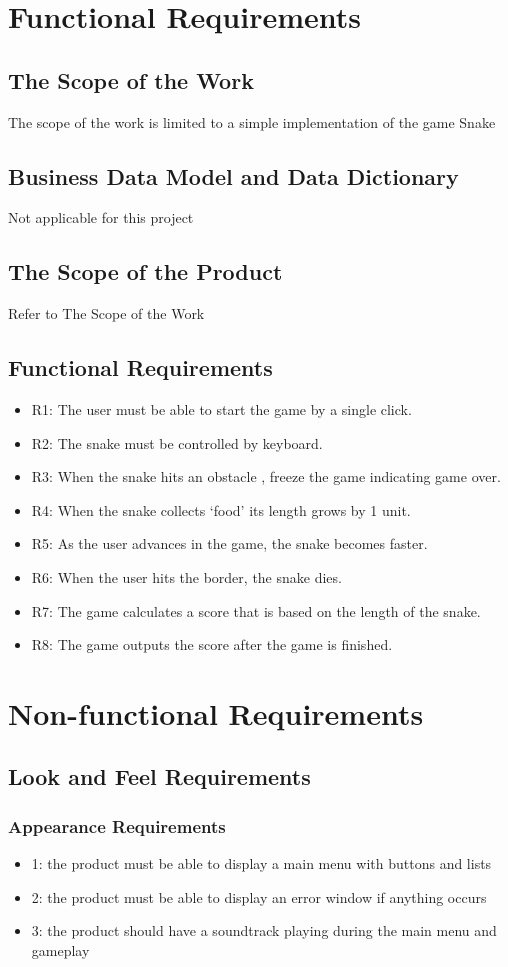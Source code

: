 \documentclass[12pt]{article}
\begin{document}
\section{Functional Requirements}
\subsection{The Scope of the Work}
The scope of the work is limited to a simple implementation of the game Snake
\subsection{Business Data Model and Data Dictionary}
Not applicable for this project
\subsection{The Scope of the Product}
Refer to The Scope of the Work
\subsection{Functional Requirements}
\begin{itemize}
\item R1: The user must be able to start the game by a single click.
\item R2: The snake must be controlled by keyboard.
\item R3: When the snake hits an obstacle , freeze the game indicating game over.
\item R4: When the snake collects ‘food’ its length grows by 1 unit.
\item R5: As the user advances in the game, the snake becomes faster.
\item R6: When the user hits the border, the snake dies.
\item R7: The game calculates a score that is based on the length of the snake.
\item R8: The game outputs the score after the game is finished.
\end{itemize}

\section{Non-functional Requirements} 
\subsection{Look and Feel Requirements}
\subsubsection*{Appearance Requirements}
\begin{itemize}
\item 1: the product must be able to display a main menu with buttons and lists
\item 2: the product must be able to display an error window if anything occurs
\item 3: the product should have a soundtrack playing during the main menu and gameplay
\end{itemize}
\end{document}
